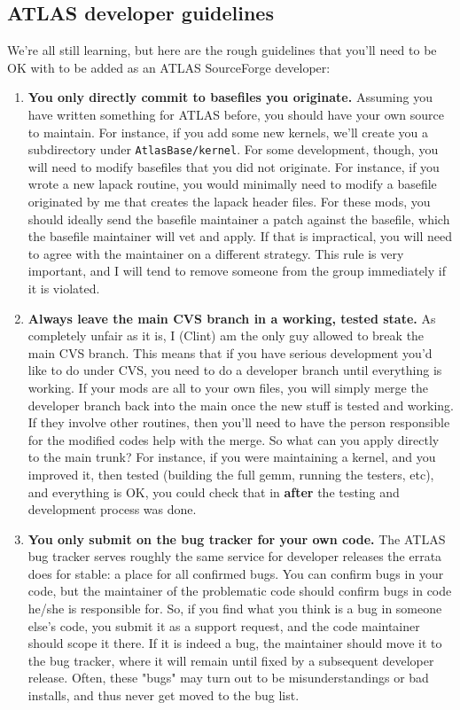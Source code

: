 \documentclass[11pt]{article}
\begin{document}
\subsection{ATLAS developer guidelines}
We're all still learning, but here are the rough guidelines that you'll
need to be OK with to be added as an ATLAS SourceForge developer:
\begin{enumerate}

\item {\bf You only directly commit to basefiles you originate.}  Assuming
you have written something for ATLAS before, you should have your own
source to maintain.  For instance, if you add some new kernels, we'll
create you a subdirectory under {\tt AtlasBase/kernel}.  For some
development, though, you will need to modify basefiles that you did not
originate.  For instance, if you wrote a new lapack routine, you would
minimally need to modify a basefile originated by me that creates the lapack
header files.  For these mods, you should ideally send the basefile maintainer
a patch against the basefile, which the basefile maintainer will vet and apply.
If that is impractical, you will need to agree with the maintainer on a
different strategy.  This rule is very important, and I will tend to remove
someone from the group immediately if it is violated.

\item {\bf Always leave the main CVS branch in a working, tested state.}
As completely unfair as it is, I (Clint) am the only guy allowed to break
the main CVS branch.  This means that if you have serious development you'd
like to do under CVS, you need to do a developer branch until everything is
working.  If your mods are all to your own files, you will simply merge the
developer branch back into the main once the new stuff is tested and working.
If they involve other routines, then you'll need to have the person
responsible for the modified codes help with the merge.  So what can you
apply directly to the main trunk?  For instance, if you were maintaining
a kernel, and you improved it, then tested (building the full gemm,
running the testers, etc), and everything is OK, you could
check that in {\bf after} the testing and development process was done.

\item{\bf You only submit on the bug tracker for your own code.}
The ATLAS bug tracker serves roughly the same service for developer
releases the errata does for stable: a place for all confirmed bugs.
You can confirm bugs in your code, but the maintainer of the problematic
code should confirm bugs in code he/she is responsible for.  So, if
you find what you think is a bug in someone else's code, you submit it as a
support request, and the code maintainer should scope it there.  If it is
indeed a bug, the maintainer should move it to the bug tracker, where it
will remain until fixed by a subsequent developer release.  Often, these
"bugs" may turn out to be misunderstandings or bad installs, and thus never
get moved to the bug list.


\end{enumerate}
\end{document}
